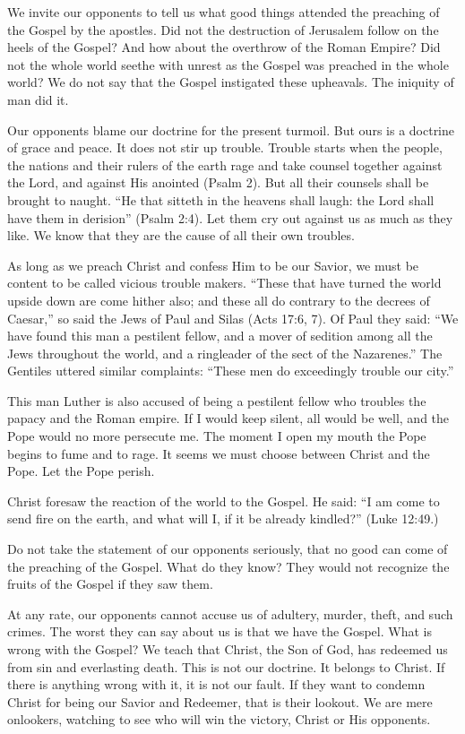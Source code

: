 We invite our opponents to tell us what good things attended the preaching of the Gospel by the apostles. Did not the destruction of Jerusalem follow on the heels of the Gospel? And how about the overthrow of the Roman Empire? Did not the whole world seethe with unrest as the Gospel was preached in the whole world? We do not say that the Gospel instigated these upheavals. The iniquity of man did it.

Our opponents blame our doctrine for the present turmoil. But ours is a doctrine of grace and peace. It does not stir up trouble. Trouble starts when the people, the nations and their rulers of the earth rage and take counsel together against the Lord, and against His anointed (Psalm 2). But all their counsels shall be brought to naught. “He that sitteth in the heavens shall laugh: the Lord shall have them in derision” (Psalm 2:4). Let them cry out against us as much as they like. We know that they are the cause of all their own troubles.

As long as we preach Christ and confess Him to be our Savior, we must be content to be called vicious trouble makers. “These that have turned the world upside down are come hither also; and these all do contrary to the decrees of Caesar,” so said the Jews of Paul and Silas (Acts 17:6, 7). Of Paul they said: “We have found this man a pestilent fellow, and a mover of sedition among all the Jews throughout the world, and a ringleader of the sect of the Nazarenes.” The Gentiles uttered similar complaints: “These men do exceedingly trouble our city.”

This man Luther is also accused of being a pestilent fellow who troubles the papacy and the Roman empire. If I would keep silent, all would be well, and the Pope would no more persecute me. The moment I open my mouth the Pope begins to fume and to rage. It seems we must choose between Christ and the Pope. Let the Pope perish.

Christ foresaw the reaction of the world to the Gospel. He said: “I am come to send fire on the earth, and what will I, if it be already kindled?” (Luke 12:49.)

Do not take the statement of our opponents seriously, that no good can come of the preaching of the Gospel. What do they know? They would not recognize the fruits of the Gospel if they saw them.

At any rate, our opponents cannot accuse us of adultery, murder, theft, and such crimes. The worst they can say about us is that we have the Gospel. What is wrong with the Gospel? We teach that Christ, the Son of God, has redeemed us from sin and everlasting death. This is not our doctrine. It belongs to Christ. If there is anything wrong with it, it is not our fault. If they want to condemn Christ for being our Savior and Redeemer, that is their lookout. We are mere onlookers, watching to see who will win the victory, Christ or His opponents.

